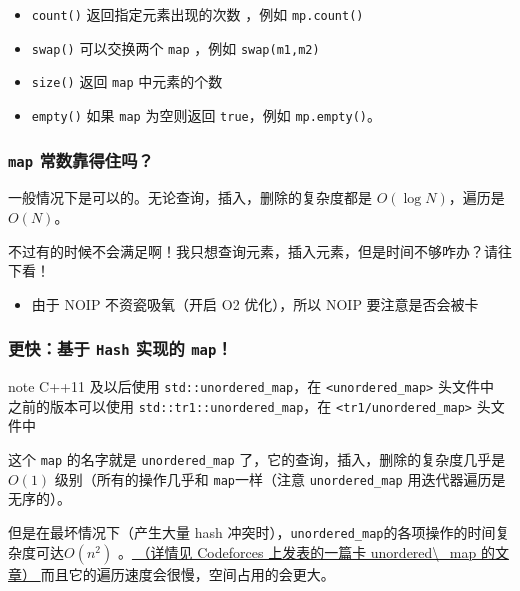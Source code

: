 \begin{itemize}
\item \texttt{count()} 返回指定元素出现的次数 ，例如 \texttt{mp.count()}
\item \texttt{swap()} 可以交换两个 \texttt{map} ，例如 \texttt{swap(m1,m2)}
\item \texttt{size()} 返回 \texttt{map} 中元素的个数
\item \texttt{empty()} 如果 \texttt{map} 为空则返回 \texttt{true}，例如 \texttt{mp.empty()}。
\end{itemize}

\subsubsection{\texttt{map} 常数靠得住吗？}

一般情况下是可以的。无论查询，插入，删除的复杂度都是 $O(\log N)$，遍历是 $O(N)$。

不过有的时候不会满足啊！我只想查询元素，插入元素，但是时间不够咋办？请往下看！

\begin{itemize}
\item 由于 NOIP 不资瓷吸氧（开启 O2 优化），所以 NOIP 要注意是否会被卡
\end{itemize}

\subsubsection{更快：基于 \texttt{Hash} 实现的 \texttt{map}！}

\begin{NOTE}{note}{}
C++11 及以后使用 \texttt{std::unordered\_map}，在 \texttt{<unordered\_map>} 头文件中
之前的版本可以使用 \texttt{std::tr1::unordered\_map}，在 \texttt{<tr1/unordered\_map>} 头文件中

\end{NOTE}


这个 \texttt{map} 的名字就是 \texttt{unordered\_map} 了，它的查询，插入，删除的复杂度几乎是 $O(1)$ 级别（所有的操作几乎和 \texttt{map}一样（注意 \texttt{unordered\_map} 用迭代器遍历是无序的）。

但是在最坏情况下（产生大量 hash 冲突时），\texttt{unordered\_map}的各项操作的时间复杂度可达$O(n^2)$ 。\href{http://codeforces.com/blog/entry/62393}{ （详情见 Codeforces 上发表的一篇卡 unordered\textbackslash{}\_map 的文章） } 而且它的遍历速度会很慢，空间占用的会更大。
